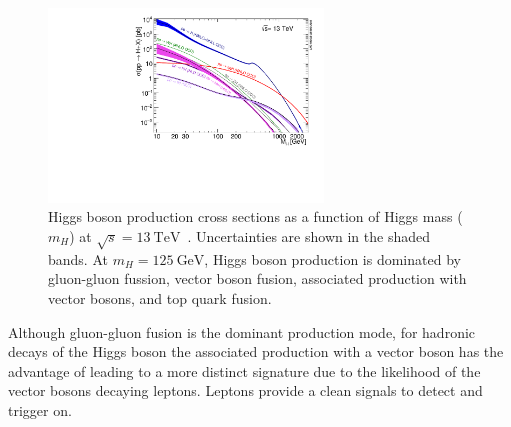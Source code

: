 \begin{figure}[!htbp]
  \centering
  \includegraphics[width=0.65\textwidth]{chapters/1.theory/figs/plotAll_13tev_BSM_sqrt.pdf}
  \caption{
    Higgs boson production cross sections as a function of Higgs mass ($m_H$) at $\sqrt{s} = \SI{13}{\TeV}$~\cite{deFlorian:2016spz}.
    Uncertainties are shown in the shaded bands.
    At $m_H = \SI{125}{\GeV}$, Higgs boson production is dominated by gluon-gluon fussion, vector boson fusion, associated production with vector bosons, and top quark fusion.
  }
  \label{fig:higgs_production_xs}
\end{figure}

Although gluon-gluon fusion is the dominant production mode, for hadronic decays of the Higgs boson the associated production with a vector boson has the advantage of leading to a more distinct signature due to the likelihood of the vector bosons decaying leptons.
Leptons provide a clean signals to detect and trigger on.


